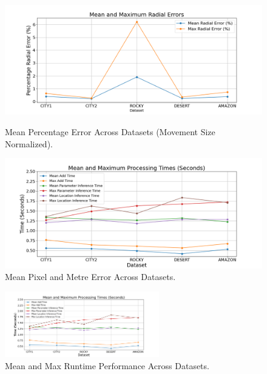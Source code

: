 \begin{figure}[H]
    \begin{minipage}{0.49\textwidth}
           \centering
        \centering
        \includegraphics[width=\textwidth]{Chapter 5/RESULTPLOTS/newkey/percacc.png}
        \caption{Mean Percentage Error Across Datasets (Movement Size Normalized).}
        \label{fig:Accuracy}
    \end{minipage} \hfill
    \begin{minipage}{0.49\textwidth}
        \centering
        \includegraphics[width=\textwidth]{Chapter 5/RESULTPLOTS/newkey/pixmetacc.png}
        \caption{Mean Pixel and Metre Error Across Datasets.}
        \label{fig:Pixel Accuracy}
    \end{minipage}
\end{figure}


\begin{figure}[H]
    \centering
    \includegraphics[width=0.6\textwidth]{Chapter 5/RESULTPLOTS/newkey/pixmetacc.png}
    \caption{Mean and Max Runtime Performance Across Datasets.}
    \label{fig:Runtimeopt}
\end{figure}



